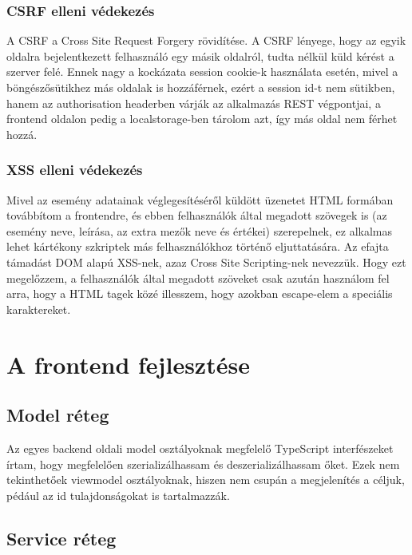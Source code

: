 \documentclass[a4paper,12pt]{report}
\theoremstyle{definition}
\theoremstyle{remark}
\begin{document}
	\subsection{CSRF elleni védekezés}

A CSRF a Cross Site Request Forgery rövidítése. A CSRF lényege, hogy az egyik oldalra bejelentkezett felhasználó egy másik oldalról, tudta nélkül küld kérést a szerver felé\cite{Infbiztwebsite}. Ennek nagy a kockázata session cookie-k használata esetén, mivel a böngészősütikhez más oldalak is hozzáférnek, ezért a session id-t nem sütikben, hanem az authorisation headerben várják az alkalmazás REST végpontjai, a frontend oldalon pedig a localstorage-ben tárolom azt, így más oldal nem férhet hozzá.


	\subsection{XSS elleni védekezés}

Mivel az esemény adatainak véglegesítéséről küldött üzenetet HTML formában továbbítom a frontendre, és ebben felhasználók által megadott szövegek is (az esemény neve, leírása, az extra mezők neve és értékei) szerepelnek, ez alkalmas lehet kártékony szkriptek más felhasználókhoz történő eljuttatására. Az efajta támadást DOM alapú XSS-nek, azaz Cross Site Scripting-nek nevezzük\cite{Infbiztwebsite}. Hogy ezt megelőzzem, a felhasználók által megadott szöveket csak azután használom fel arra, hogy a HTML tagek közé illesszem, hogy azokban escape-elem a speciális karaktereket.

\chapter{A frontend fejlesztése}

\section{Model réteg}

Az egyes backend oldali model osztályoknak megfelelő TypeScript interfészeket írtam, hogy megfelelően szerializálhassam és deszerializálhassam őket. Ezek nem tekinthetőek viewmodel\cite{Viewmodelwebsite} osztályoknak, hiszen nem csupán a megjelenítés a céljuk, pédául az id tulajdonságokat is tartalmazzák.

\section{Service réteg}
\end{document}
